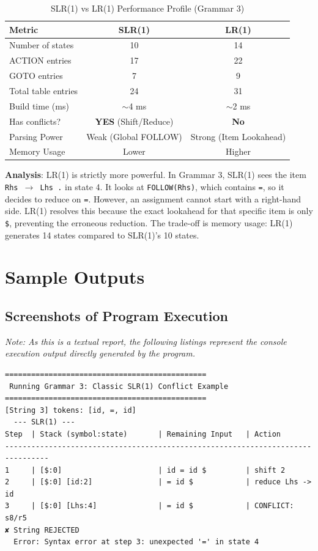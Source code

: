 \documentclass[11pt,a4paper]{article}
\begin{document}
\begin{table}[h]
\centering
\begin{tabular}{|l|c|c|}
\hline
\textbf{Metric} & \textbf{SLR(1)} & \textbf{LR(1)} \\ \hline
Number of states & 10 & 14 \\ \hline
ACTION entries & 17 & 22 \\ \hline
GOTO entries & 7 & 9 \\ \hline
Total table entries & 24 & 31 \\ \hline
Build time (ms) & $\sim$4 ms & $\sim$2 ms \\ \hline
Has conflicts? & \textbf{YES} (Shift/Reduce) & \textbf{No} \\ \hline
Parsing Power & Weak (Global FOLLOW) & Strong (Item Lookahead) \\ \hline
Memory Usage & Lower & Higher \\ \hline
\end{tabular}
\caption{SLR(1) vs LR(1) Performance Profile (Grammar 3)}
\end{table}

\textbf{Analysis}: LR(1) is strictly more powerful. In Grammar 3, SLR(1) sees the item \texttt{Rhs $\rightarrow$ Lhs .} in state 4. It looks at \texttt{FOLLOW(Rhs)}, which contains \texttt{=}, so it decides to reduce on \texttt{=}. However, an assignment cannot start with a right-hand side. LR(1) resolves this because the exact lookahead for that specific item is only \texttt{\$}, preventing the erroneous reduction. The trade-off is memory usage: LR(1) generates 14 states compared to SLR(1)'s 10 states.

\section{Sample Outputs}

\subsection{Screenshots of Program Execution}
\textit{Note: As this is a textual report, the following listings represent the console execution output directly generated by the program.}

\begin{verbatim}
==============================================
 Running Grammar 3: Classic SLR(1) Conflict Example
==============================================
[String 3] tokens: [id, =, id]
  --- SLR(1) ---
Step  | Stack (symbol:state)       | Remaining Input   | Action
--------------------------------------------------------------------------------
1     | [$:0]                      | id = id $         | shift 2
2     | [$:0] [id:2]               | = id $            | reduce Lhs -> id
3     | [$:0] [Lhs:4]              | = id $            | CONFLICT: s8/r5
✘ String REJECTED
  Error: Syntax error at step 3: unexpected '=' in state 4
\end{verbatim}
\end{document}
